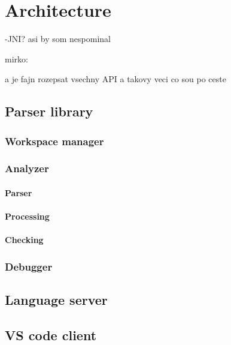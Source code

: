 \chapter{Architecture}

-JNI? asi by som nespominal

mirko:

a je fajn rozepsat vsechny API a takovy veci co sou po ceste

\section{Parser library}

\subsection{Workspace manager}

\subsection{Analyzer}

\subsubsection{Parser}
\subsubsection{Processing}
\subsubsection{Checking}

\subsection{Debugger}

\section{Language server}

\section{VS code client}




